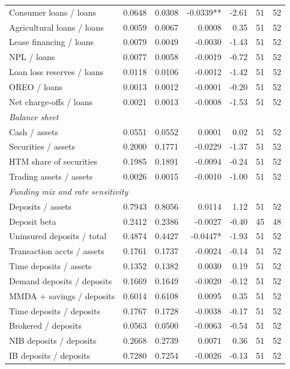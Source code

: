 \begin{tabular}{lrrrrrr}
Consumer loans / loans & 0.0648 & 0.0308 & -0.0339** & -2.61 & 51 & 52 \\
Agricultural loans / loans & 0.0059 & 0.0067 & 0.0008 & 0.35 & 51 & 52 \\
Lease financing / loans & 0.0079 & 0.0049 & -0.0030 & -1.43 & 51 & 52 \\
NPL / loans & 0.0077 & 0.0058 & -0.0019 & -0.72 & 51 & 52 \\
Loan loss reserves / loans & 0.0118 & 0.0106 & -0.0012 & -1.42 & 51 & 52 \\
OREO / loans & 0.0013 & 0.0012 & -0.0001 & -0.20 & 51 & 52 \\
Net charge-offs / loans & 0.0021 & 0.0013 & -0.0008 & -1.53 & 51 & 52 \\
\midrule
\multicolumn{7}{l}{\emph{Balance sheet}} \\
\midrule
Cash / assets & 0.0551 & 0.0552 & 0.0001 & 0.02 & 51 & 52 \\
Securities / assets & 0.2000 & 0.1771 & -0.0229 & -1.37 & 51 & 52 \\
HTM share of securities & 0.1985 & 0.1891 & -0.0094 & -0.24 & 51 & 52 \\
Trading assets / assets & 0.0026 & 0.0015 & -0.0010 & -1.00 & 51 & 52 \\
\midrule
\multicolumn{7}{l}{\emph{Funding mix and rate sensitivity}} \\
\midrule
Deposits / assets & 0.7943 & 0.8056 & 0.0114 & 1.12 & 51 & 52 \\
Deposit beta & 0.2412 & 0.2386 & -0.0027 & -0.40 & 45 & 48 \\
Uninsured deposits / total & 0.4874 & 0.4427 & -0.0447* & -1.93 & 51 & 52 \\
Transaction accts / assets & 0.1761 & 0.1737 & -0.0024 & -0.14 & 51 & 52 \\
Time deposits / assets & 0.1352 & 0.1382 & 0.0030 & 0.19 & 51 & 52 \\
Demand deposits / deposits & 0.1669 & 0.1649 & -0.0020 & -0.12 & 51 & 52 \\
MMDA + savings / deposits & 0.6014 & 0.6108 & 0.0095 & 0.35 & 51 & 52 \\
Time deposits / deposits & 0.1767 & 0.1728 & -0.0038 & -0.17 & 51 & 52 \\
Brokered / deposits & 0.0563 & 0.0500 & -0.0063 & -0.54 & 51 & 52 \\
NIB deposits / deposits & 0.2668 & 0.2739 & 0.0071 & 0.36 & 51 & 52 \\
IB deposits / deposits & 0.7280 & 0.7254 & -0.0026 & -0.13 & 51 & 52 \\

\end{tabular}
